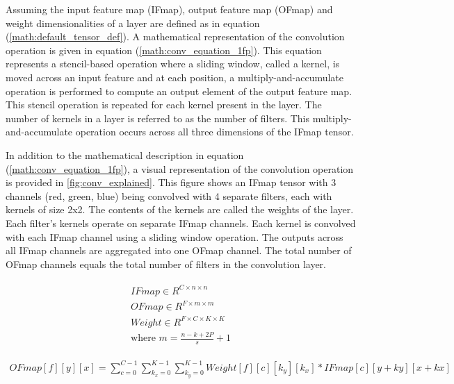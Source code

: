 Assuming the input feature map (IFmap), output feature map (OFmap) and weight
dimensionalities of a layer are defined as in equation
(\autoref{math:default_tensor_def}). A mathematical representation of the
convolution operation is given in equation (\autoref{math:conv_equation_1fp}).
This equation represents a stencil-based operation where a sliding window,
called a kernel, is moved across an input feature and at each position, a
multiply-and-accumulate operation is performed to compute an output element of
the output feature map. This stencil operation is repeated for each kernel
present in the layer. The number of kernels in a layer is referred to as the
number of filters. This multiply-and-accumulate operation occurs across all
three dimensions of the IFmap tensor.

In addition to the mathematical description in equation
(\autoref{math:conv_equation_1fp}), a visual representation of the convolution
operation is provided in \autoref{fig:conv_explained}. This figure shows an
IFmap tensor with 3 channels (red, green, blue) being convolved with 4 separate
filters, each with kernels of size 2x2. The contents of the kernels are called
the weights of the layer. Each filter's kernels operate on separate IFmap
channels. Each kernel is convolved with each IFmap channel using a sliding
window operation. The outputs across all IFmap channels are aggregated into one
OFmap channel. The total number of OFmap channels equals the total number of
filters in the convolution layer.


\begin{align}
    \begin{split}
        IFmap \in R^{C \times n\times n} \\
        OFmap \in  R^{F \times m\times m} \\
        Weight \in R^{F \times C\times K\times K} \\
        \text{where }m=\frac{n-k+2P}{s}+1
    \end{split}
    \label{math:default_tensor_def}
\end{align}

\begin{align}
    OFmap[f][y][x] = \displaystyle\sum\limits_{c=0}^{C-1}\displaystyle\sum\limits_{k_x=0}^{K-1}\displaystyle\sum\limits_{k_y=0}^{K-1}Weight[f][c][k_y][k_x]*IFmap[c][y+ky][x+kx]
    \label{math:conv_equation_1fp}
\end{align}

